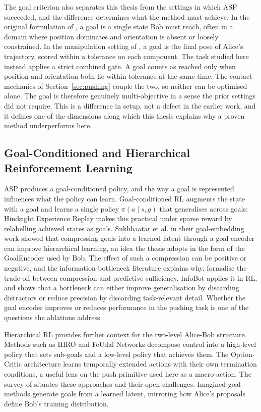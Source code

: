 The goal criterion also separates this thesis from the settings in which ASP
succeeded, and the difference determines what the method must achieve. In the
original formulation of \cite{Sukhbaatar2018IntrinsicMotivation}, a goal is a
single state Bob must reach, often in a domain where position dominates and
orientation is absent or loosely constrained. In the manipulation setting of
\cite{OpenAI2021AsymmetricSF}, a goal is the final pose of Alice's trajectory,
scored within a tolerance on each component. The task studied here instead applies
a strict combined gate. A goal counts as reached only when position and orientation
both lie within tolerance at the same time. The contact mechanics of
Section~\ref{sec:pushing} couple the two, so neither can be optimised alone. The
goal is therefore genuinely multi-objective in a sense the prior settings did not
require. This is a difference in setup, not a defect in the earlier work, and it
defines one of the dimensions along which this thesis explains why a proven method
underperforms here.

\subsection{Goal-Conditioned and Hierarchical Reinforcement Learning}
\label{sec:gcrl}

ASP produces a goal-conditioned policy, and the way a goal is represented
influences what the policy can learn. Goal-conditioned RL augments the state with
a goal and learns a single policy $\pi(a \mid s, g)$ that generalises across
goals; Hindsight Experience Replay \cite{Andrychowicz2017} makes this practical
under sparse reward by relabelling achieved states as goals. Sukhbaatar et al. in
their goal-embedding work \cite{Sukhbaatar2018GoalEmbeddings} showed that
compressing goals into a learned latent through a goal encoder can improve
hierarchical learning, an idea the thesis adopts in the form of the GoalEncoder
used by Bob. The effect of such a compression can be positive or negative, and the
information-bottleneck literature explains why. \cite{Tishby2015InfoBottleneck}
formalise the trade-off between compression and predictive sufficiency. InfoBot
\cite{Goyal2019InfoBot} applies it in RL, and shows that a bottleneck can either
improve generalisation by discarding distractors or reduce precision by discarding
task-relevant detail. Whether the goal encoder improves or reduces performance in
the pushing task is one of the questions the ablations address.

Hierarchical RL provides further context for the two-level Alice-Bob structure.
Methods such as HIRO \cite{Nachum2018DataEfficientHR} and FeUdal Networks
\cite{Vezhnevets2017FeUdal} decompose control into a high-level policy that sets
sub-goals and a low-level policy that achieves them. The Option-Critic architecture
\cite{Bacon2017OptionCritic} learns temporally extended actions with their own
termination conditions, a useful lens on the push primitive used here as a
macro-action. The survey of \cite{Hutsebaut2022HRLSurvey} situates these
approaches and their open challenges. Imagined-goal methods
\cite{Nair2018ImaginedGoals} generate goals from a learned latent, mirroring how
Alice's proposals define Bob's training distribution.

